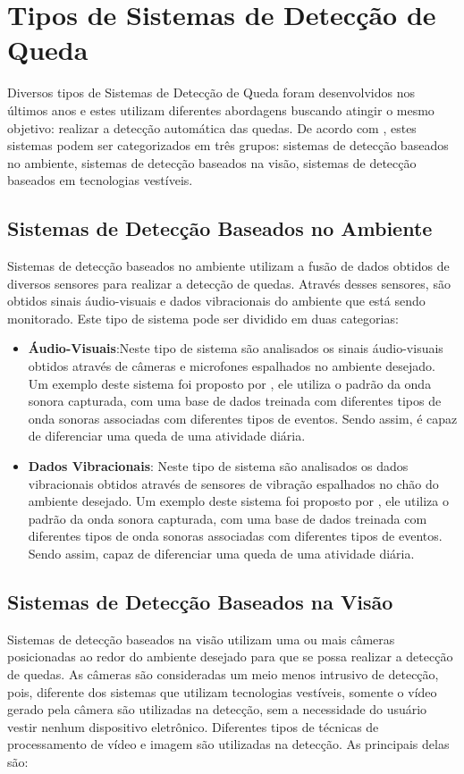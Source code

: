 \section{Tipos de Sistemas de Detecção de Queda}
\label{sec:fds_types}
Diversos tipos de Sistemas de Detecção de Queda foram desenvolvidos nos últimos anos e estes utilizam diferentes abordagens buscando atingir o mesmo objetivo: realizar a detecção automática das quedas. De acordo com \cite{mubashir2013survey}, estes sistemas podem ser categorizados em três grupos: sistemas de detecção baseados no ambiente, sistemas de detecção baseados na visão, sistemas de detecção baseados em tecnologias vestíveis.

\subsection{Sistemas de Detecção Baseados no Ambiente}
Sistemas de detecção baseados no ambiente utilizam a fusão de dados obtidos de diversos sensores para realizar a detecção de quedas. Através desses sensores, são obtidos sinais áudio-visuais e dados vibracionais do ambiente que está sendo monitorado. Este tipo de sistema pode ser dividido em duas categorias:

\begin{itemize}
	\item{\textbf{Áudio-Visuais}:Neste tipo de sistema são analisados os sinais áudio-visuais obtidos através de câmeras e microfones espalhados no ambiente desejado. Um exemplo deste sistema foi proposto por \cite{zhuang2009acoustic}, ele utiliza o padrão da onda sonora capturada, com uma base de dados treinada  com diferentes tipos de onda sonoras associadas com diferentes tipos de eventos. Sendo assim, é capaz de diferenciar uma queda de uma atividade diária. }
	
	\item{\textbf{Dados Vibracionais}: Neste tipo de sistema são analisados os dados vibracionais obtidos através de sensores de vibração espalhados no chão do ambiente desejado. Um exemplo deste sistema foi proposto por \cite{alwan2006smart}, ele utiliza o padrão da onda sonora capturada, com uma base de dados treinada  com diferentes tipos de onda sonoras associadas com diferentes tipos de eventos. Sendo assim, capaz de diferenciar uma queda de uma atividade diária. }
\end{itemize}



\subsection{Sistemas de Detecção Baseados na Visão}
Sistemas de detecção baseados na visão utilizam uma ou mais câmeras posicionadas ao redor do ambiente desejado para  que se possa realizar a detecção de quedas. As câmeras são consideradas um meio menos intrusivo de detecção, pois, diferente dos sistemas que utilizam tecnologias vestíveis, somente o vídeo gerado pela câmera são utilizadas na detecção, sem a necessidade do usuário vestir nenhum dispositivo eletrônico. Diferentes tipos de técnicas de processamento de vídeo e imagem são utilizadas na detecção. As principais delas são:  

